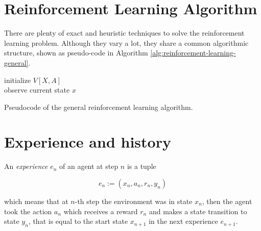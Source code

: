 \section{Reinforcement Learning Algorithm}
\label{sec:reinforcement-learning-algorith}
There are plenty of exact and heuristic techniques to solve the reinforcement learning problem.
Although they vary a lot, they share a common algorithmic structure, shown as pseudo-code in Algorithm \ref{alg:reinforcement-learning-general}.

\begin{algorithm}[t]
	\label{alg:reinforcement-learning-general}
	
	
	
	initialize $V[X,A]$ \\
	observe current state $x$ \\
	
	\caption{Pseudocode of the general reinforcement learning algorithm.}
\end{algorithm}



\section{Experience and history}
\label{sec:reinforcement-learning-experience-history}
An \textit{experience} $e_{n}$ of an agent at step $n$ is a tuple

$$
e_{n}:=(x_{n},a_{n},r_{n},y_{n})
$$

which means that at $n$-th step the environment was in state $x_{n}$, then the agent took the action $a_{n}$ which receives a reward $r_{n}$ and makes a state transition to state $y_{n}$, that is equal to the start state $x_{n+1}$ in the next experience $e_{n+1}$.

